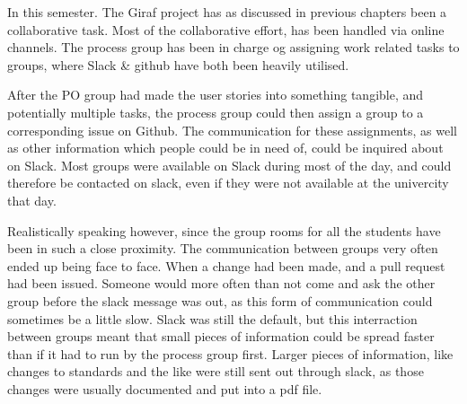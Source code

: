 In this semester.
The Giraf project has as discussed in previous chapters been a collaborative task.
Most of the collaborative effort, has been handled via online channels.
The process group has been in charge og assigning work related tasks to groups, where Slack \& github have both been heavily utilised.

After the PO group had made the user stories into something tangible, and potentially multiple tasks, the process group could then assign a group to a corresponding issue on Github.
The communication for these assignments, as well as other information which people could be in need of, could be inquired about on Slack.
Most groups were available on Slack during most of the day, and could therefore be contacted on slack, even if they were not available at the univercity that day.

Realistically speaking however, since the group rooms for all the students have been in such a close proximity.
The communication between groups very often ended up being face to face.
When a change had been made, and a pull request had been issued.
Someone would more often than not come and ask the other group before the slack message was out, as this form of communication could sometimes be a little slow.
Slack was still the default, but this interraction between groups meant that small pieces of information could be spread faster than if it had to run by the process group first.
Larger pieces of information, like changes to standards and the like were still sent out through slack, as those changes were usually documented and put into a pdf file.

